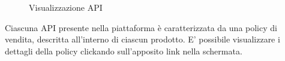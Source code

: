 \label{Visualizzazione API}
\begin{figure}[H]
	\centering
	\caption{Visualizzazione API}
\end{figure}

Ciascuna API presente nella piattaforma è caratterizzata da una policy di vendita, descritta all'interno di ciascun prodotto. E' possibile visualizzare i dettagli della policy clickando sull'apposito link nella schermata.

